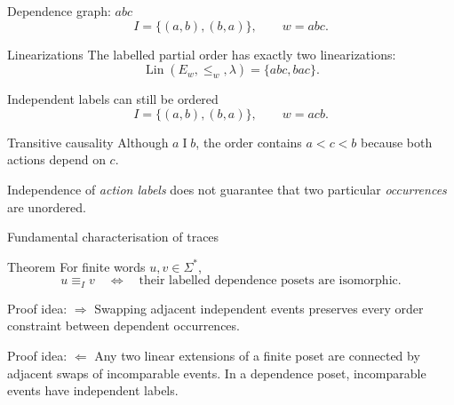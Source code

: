 \documentclass[t,11pt]{beamer}
\newcommand{\lin}{\operatorname{Lin}}
\newcommand{\ind}{\mathrel{I}}
\begin{document}
\begin{frame}{Dependence graph: $abc$}
  \[
      I=\{(a,b),(b,a)\},\qquad w=abc.
  \]
  \begin{center}
  \end{center}
  \begin{block}{Linearizations}
    The labelled partial order has exactly two linearizations:
    \[
       \lin(E_w,\leq_w,\lambda)=\{abc,bac\}.
    \]
  \end{block}
\end{frame}

\begin{frame}{Independent labels can still be ordered}
  \[
     I=\{(a,b),(b,a)\},\qquad w=acb.
  \]
  \begin{center}
  \end{center}
  \begin{block}{Transitive causality}
    Although $a\ind b$, the order contains $a<c<b$ because both actions depend on $c$.
  \end{block}
  \vspace{0.2cm}
  Independence of \emph{action labels} does not guarantee that two particular \emph{occurrences} are unordered.
\end{frame}

\begin{frame}{Fundamental characterisation of traces}
  \begin{block}{Theorem}
    For finite words $u,v\in\Sigma^*$,
    \[
       u\equiv_Iv
       \quad\Longleftrightarrow\quad
       \text{their labelled dependence posets are isomorphic}.
    \]
  \end{block}
  \begin{block}{Proof idea: $\Rightarrow$}
    Swapping adjacent independent events preserves every order constraint between dependent occurrences.
  \end{block}
  \begin{block}{Proof idea: $\Leftarrow$}
    Any two linear extensions of a finite poset are connected by adjacent swaps of incomparable events. In a dependence poset, incomparable events have independent labels.
  \end{block}
\end{frame}
\end{document}
